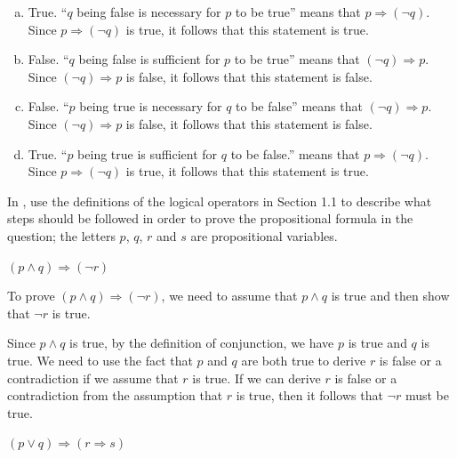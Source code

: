\begin{mysolution}
    \begin{enumerate}[(a)]
    \item True. ``$q$ being false is necessary for $p$ to be true'' means that $p \Rightarrow (\neg q)$. Since $p \Rightarrow (\neg q)$ is true, it follows that this statement is true.
    \item False. ``$q$ being false is sufficient for $p$ to be true'' means that $(\neg q) \Rightarrow p$. Since $(\neg q) \Rightarrow p$ is false, it follows that this statement is false.
    \item False. ``$p$ being true is necessary for $q$ to be false'' means that $(\neg q) \Rightarrow p$. Since $(\neg q) \Rightarrow p$ is false, it follows that this statement is false.
    \item True. ``$p$ being true is sufficient for $q$ to be false.'' means that $p \Rightarrow (\neg q)$. Since $p \Rightarrow (\neg q)$ is true, it follows that this statement is true.
    \end{enumerate}
\end{mysolution}

In , use the definitions of the logical operators in Section 1.1 to describe what steps should be followed in order to prove the propositional formula in the question; the letters $p$, $q$, $r$ and $s$ are propositional variables.

\begin{chapex}
\label{cqStructureProofBegin}
$(p \wedge q) \Rightarrow (\neg r)$
\end{chapex}

\begin{mysolution}
    To prove $(p \wedge q) \Rightarrow (\neg r)$, we need to assume that $p \wedge q$ is true and then show that $\neg r$ is true. 

    Since $p \wedge q$ is true, by the definition of conjunction, we have $p$ is true and $q$ is true. We need to use the fact that $p$ and $q$ are both true to derive $r$ is false or a contradiction if we assume that $r$ is true. If we can derive $r$ is false or a contradiction from the assumption that $r$ is true, then it follows that $\neg r$ must be true. 
\end{mysolution}

\begin{chapex}
$(p \vee q) \Rightarrow (r \Rightarrow s)$
\end{chapex}

